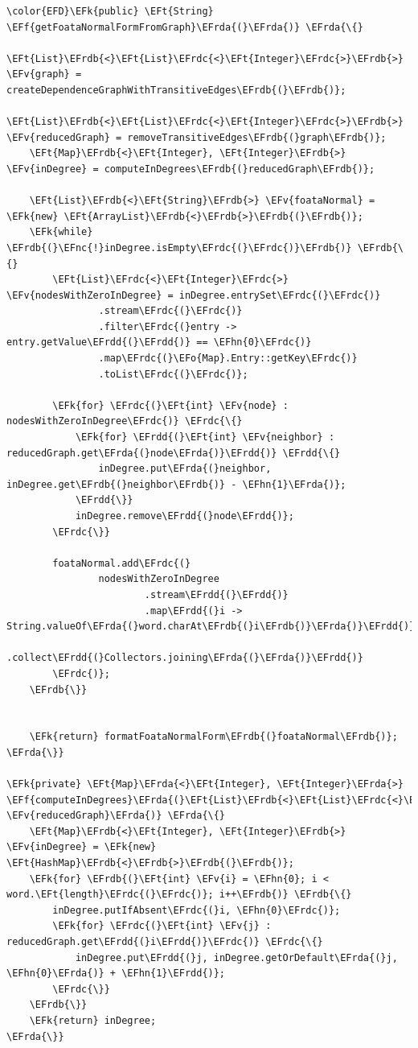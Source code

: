 \documentclass[11pt]{article}
\newcommand{\EFk}[1]{\textcolor{EFk}{#1}} %
\newcommand{\EFf}[1]{\textcolor{EFf}{#1}} %
\newcommand{\EFv}[1]{\textcolor{EFv}{#1}} %
\newcommand{\EFt}[1]{\textcolor{EFt}{#1}} %
\newcommand{\EFo}[1]{\textcolor{EFo}{#1}} %
\newcommand{\EFnc}[1]{\textcolor{EFnc}{\textbf{#1}}} %
\newcommand{\EFhn}[1]{\textcolor{EFhn}{#1}} %
\newcommand{\EFrda}[1]{#1} %
\newcommand{\EFrdb}[1]{\textcolor{EFrdb}{#1}} %
\newcommand{\EFrdc}[1]{\textcolor{EFrdc}{#1}} %
\newcommand{\EFrdd}[1]{\textcolor{EFrdd}{#1}} %
\begin{document}
\begin{Code}
\begin{Verbatim}
\color{EFD}\EFk{public} \EFt{String} \EFf{getFoataNormalFormFromGraph}\EFrda{(}\EFrda{)} \EFrda{\{}
    \EFt{List}\EFrdb{<}\EFt{List}\EFrdc{<}\EFt{Integer}\EFrdc{>}\EFrdb{>} \EFv{graph} = createDependenceGraphWithTransitiveEdges\EFrdb{(}\EFrdb{)};
    \EFt{List}\EFrdb{<}\EFt{List}\EFrdc{<}\EFt{Integer}\EFrdc{>}\EFrdb{>} \EFv{reducedGraph} = removeTransitiveEdges\EFrdb{(}graph\EFrdb{)};
    \EFt{Map}\EFrdb{<}\EFt{Integer}, \EFt{Integer}\EFrdb{>} \EFv{inDegree} = computeInDegrees\EFrdb{(}reducedGraph\EFrdb{)};

    \EFt{List}\EFrdb{<}\EFt{String}\EFrdb{>} \EFv{foataNormal} = \EFk{new} \EFt{ArrayList}\EFrdb{<}\EFrdb{>}\EFrdb{(}\EFrdb{)};
    \EFk{while} \EFrdb{(}\EFnc{!}inDegree.isEmpty\EFrdc{(}\EFrdc{)}\EFrdb{)} \EFrdb{\{}
        \EFt{List}\EFrdc{<}\EFt{Integer}\EFrdc{>} \EFv{nodesWithZeroInDegree} = inDegree.entrySet\EFrdc{(}\EFrdc{)}
                .stream\EFrdc{(}\EFrdc{)}
                .filter\EFrdc{(}entry -> entry.getValue\EFrdd{(}\EFrdd{)} == \EFhn{0}\EFrdc{)}
                .map\EFrdc{(}\EFo{Map}.Entry::getKey\EFrdc{)}
                .toList\EFrdc{(}\EFrdc{)};

        \EFk{for} \EFrdc{(}\EFt{int} \EFv{node} : nodesWithZeroInDegree\EFrdc{)} \EFrdc{\{}
            \EFk{for} \EFrdd{(}\EFt{int} \EFv{neighbor} : reducedGraph.get\EFrda{(}node\EFrda{)}\EFrdd{)} \EFrdd{\{}
                inDegree.put\EFrda{(}neighbor, inDegree.get\EFrdb{(}neighbor\EFrdb{)} - \EFhn{1}\EFrda{)};
            \EFrdd{\}}
            inDegree.remove\EFrdd{(}node\EFrdd{)};
        \EFrdc{\}}

        foataNormal.add\EFrdc{(}
                nodesWithZeroInDegree
                        .stream\EFrdd{(}\EFrdd{)}
                        .map\EFrdd{(}i -> String.valueOf\EFrda{(}word.charAt\EFrdb{(}i\EFrdb{)}\EFrda{)}\EFrdd{)}
                        .collect\EFrdd{(}Collectors.joining\EFrda{(}\EFrda{)}\EFrdd{)}
        \EFrdc{)};
    \EFrdb{\}}


    \EFk{return} formatFoataNormalForm\EFrdb{(}foataNormal\EFrdb{)};
\EFrda{\}}

\EFk{private} \EFt{Map}\EFrda{<}\EFt{Integer}, \EFt{Integer}\EFrda{>} \EFf{computeInDegrees}\EFrda{(}\EFt{List}\EFrdb{<}\EFt{List}\EFrdc{<}\EFt{Integer}\EFrdc{>}\EFrdb{>} \EFv{reducedGraph}\EFrda{)} \EFrda{\{}
    \EFt{Map}\EFrdb{<}\EFt{Integer}, \EFt{Integer}\EFrdb{>} \EFv{inDegree} = \EFk{new} \EFt{HashMap}\EFrdb{<}\EFrdb{>}\EFrdb{(}\EFrdb{)};
    \EFk{for} \EFrdb{(}\EFt{int} \EFv{i} = \EFhn{0}; i < word.\EFt{length}\EFrdc{(}\EFrdc{)}; i++\EFrdb{)} \EFrdb{\{}
        inDegree.putIfAbsent\EFrdc{(}i, \EFhn{0}\EFrdc{)};
        \EFk{for} \EFrdc{(}\EFt{int} \EFv{j} : reducedGraph.get\EFrdd{(}i\EFrdd{)}\EFrdc{)} \EFrdc{\{}
            inDegree.put\EFrdd{(}j, inDegree.getOrDefault\EFrda{(}j, \EFhn{0}\EFrda{)} + \EFhn{1}\EFrdd{)};
        \EFrdc{\}}
    \EFrdb{\}}
    \EFk{return} inDegree;
\EFrda{\}}
\end{Verbatim}
\end{Code}
\end{document}
